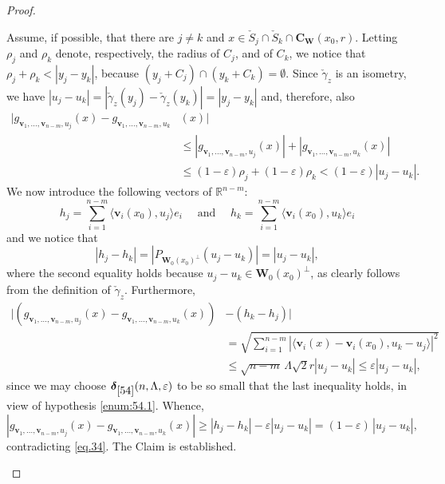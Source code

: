 \documentclass[JEP,XML,SOM,Unicode,ThmDefs,NoEqCountersInSection]{cedram}
\newenvironment{Empty*}[2][\null]{%
\begin{enonce*}[remark]{#1}#2}
{\end{enonce*}}
\newcommand{\R}{\mathbb{R}}
\newcommand{\bdelta}{\boldsymbol{\delta}}
\newcommand{\bC}{{\boldsymbol{C}}}
\newcommand{\bW}{{\boldsymbol{W}}}
\newcommand{\bv}{{\boldsymbol{v}}}
\let\veps\varepsilon
\let\la\langle
\let\ra\rangle
\begin{document}
\begin{proof}
\begin{Empty*}[Claim. \normalfont\emph{The sets $\check{S}_k \cap \bC_\bW(x_0,r)$, $k=1,2,\ldots$, are pairwise disjoint.}]
Assume, if possible, that there are $j \neq k$ and $x \in \check{S}_j \cap \check{S}_k \cap \bC_\bW(x_0,r)$.
Letting~$\rho_j$ and $\rho_k$ denote, respectively, the radius of $C_j$, and of $C_k$, we notice that $\rho_j + \rho_k < |y_j-y_k|$, because $(y_j+C_j) \cap (y_k+C_k) = \emptyset$.
Since $\check{\gamma}_z$ is an isometry, we have $|u_j-u_k| = \left| \check{\gamma}_z(y_j) - \check{\gamma}_z(y_k)\right| = |y_j-y_k|$ and, therefore, also
\begin{equation}
\label{eq.34}
\begin{split}
\bigl| g_{\bv_1,\ldots,\bv_{n-m},u_j}(x) - g_{\bv_1,\ldots,\bv_{n-m},u_k}&(x)\bigr|\\
&\leq \left| g_{\bv_1,\ldots,\bv_{n-m},u_j}(x) \right| + \left| g_{\bv_1,\ldots,\bv_{n-m},u_k}(x) \right|\\
&\leq (1-\veps)\rho_j + (1-\veps)\rho_k < (1-\veps) | u_j - u_k |.
\end{split}
\end{equation}
We now introduce the following vectors of $\R^{n-m}$:
\begin{equation*}
h_j = \sum_{i=1}^{n-m} \la \bv_i(x_0),u_j \ra e_i \quad \text{ and } \quad h_k = \sum_{i=1}^{n-m} \la \bv_i(x_0),u_k \ra e_i
\end{equation*}
and we notice that
\begin{equation*}
\left| h_j - h_k \right| = \left| P_{\bW_0(x_0)^\perp}(u_j-u_k)\right| = |u_j-u_k|,
\end{equation*}
where the second equality holds because $u_j-u_k \in \bW_0(x_0)^\perp$, as clearly follows from the definition of $\check{\gamma}_z$.
Furthermore,
\begin{align*}
\bigl|(g_{\bv_1,\ldots,\bv_{n-m},u_j}(x) - g_{\bv_1,\ldots,\bv_{n-m},u_k}(x)) &-(h_k - h_j) \bigr|\\
&= \sqrt{\textstyle\sum_{i=1}^{n-m} \left| \la \bv_i(x) - \bv_i(x_0), u_k-u_j \ra\right|^2}\\
&\leq \sqrt{n-m}\, \Lambda \sqrt{2} r \left| u_j - u_k \right| \leq \veps | u_j - u_k |,
\end{align*}
since we may choose $\bdelta_{\ref{54}}(n,\Lambda,\veps)$ to be so small that the last inequality holds, in view of hypothesis \eqref{enum:54.1}.
Whence,
\begin{equation*}
\left| g_{\bv_1,\ldots,\bv_{n-m},u_j}(x) - g_{\bv_1,\ldots,\bv_{n-m},u_k}(x)\right| \geq \left| h_j - h_k \right| - \veps \left| u_j - u_k \right| = (1-\veps) \,| u_j - u_k |,
\end{equation*}
contradicting \eqref{eq.34}.
The Claim is established.
\end{Empty*}


\end{proof}
\end{document}
